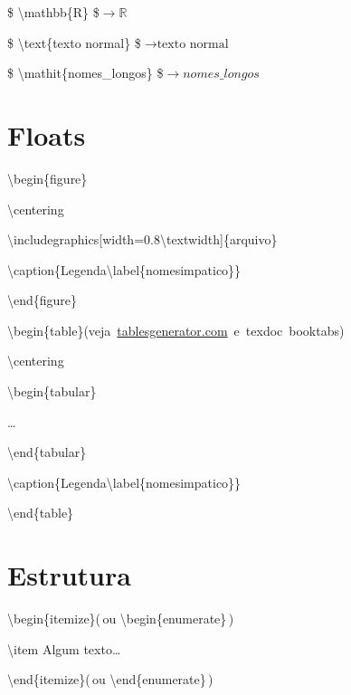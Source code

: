 \documentclass[10pt,twoside,english,brazilian]{article}
\begin{document}
\begin{multicols}{3}
\vspace{\baselineskip}


\$ \textbackslash{}mathbb\{R\} \$\enspace $\rightarrow \mathbb{R}$

\$ \textbackslash{}text\{texto normal\} \$\enspace $\rightarrow \text{texto normal}$

\$ \textbackslash{}mathit\{nomes\_longos\} \$\enspace $\rightarrow \mathit{nomes\_longos}$


\section*{Floats}

\textbackslash{}begin\{figure\}

\quad\textbackslash{}centering

\quad\textbackslash{}includegraphics[width=0.8\textbackslash{}textwidth]\{arquivo\}

\quad\textbackslash{}caption\{Legenda\textbackslash{}label\{nomesimpatico\}\}

\textbackslash{}end\{figure\}


\vspace{\baselineskip}

\textbackslash{}begin\{table\}\quad \mbox{(veja \url{tablesgenerator.com}
                                     e \textsf{texdoc booktabs})}

\quad\textbackslash{}centering

\quad\textbackslash{}begin\{tabular\}

\quad\quad\dots

\quad\textbackslash{}end\{tabular\}

\quad\textbackslash{}caption\{Legenda\textbackslash{}label\{nomesimpatico\}\}

\textbackslash{}end\{table\}

\columnbreak


\section*{Estrutura}

\textbackslash{}begin\{itemize\}\quad (\,ou \textbackslash{}begin\{enumerate\}\,)

\quad\textbackslash{}item Algum texto\dots

\textbackslash{}end\{itemize\}\quad (\,ou \textbackslash{}end\{enumerate\}\,)


\vspace{\baselineskip}



\end{multicols}
\end{document}
